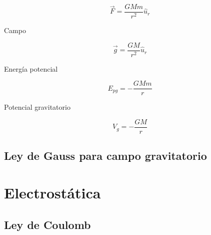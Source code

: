 \documentclass[12pt, letterpaper, twoside]{article}
\begin{document}
			\begin{equation}
				\vec{F} = \frac{GMm}{r^2} \hat{u}_r
			\end{equation}
			
			Campo
			
			\begin{equation}
				\vec{g} = \frac{GM}{r^2} \hat{u}_r
			\end{equation}
			
			Energía potencial
			
			\begin{equation}
				E_{pg} = -\frac{GMm}{r}
			\end{equation}
			
			Potencial gravitatorio
			
			\begin{equation}
				V_{g} = -\frac{GM}{r}
			\end{equation}
			
		\subsection{Ley de Gauss para campo gravitatorio}
		
			
			
	\section{Electrostática}
	
		\subsection{Ley de Coulomb}
		
		
	
\end{document}

